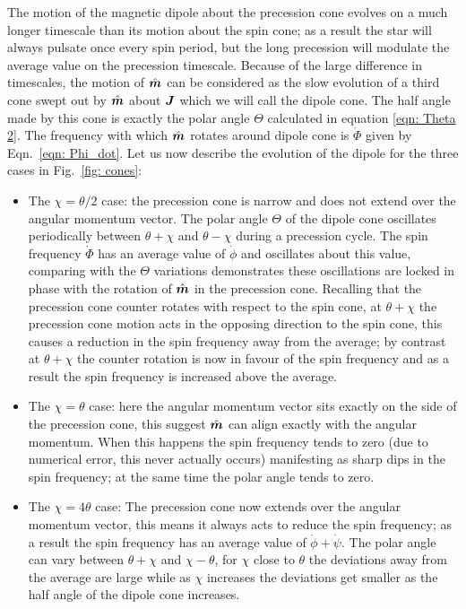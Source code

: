\documentclass[../full_thesis/full_thesis.tex]{subfiles}
\begin{document}
The motion of the magnetic dipole about the precession cone evolves on a much
longer timescale than its motion about the spin cone; as a result the star will
always pulsate once every spin period, but the long precession will modulate
the average value on the precession timescale. Because of the large difference
in timescales, the motion of $\hat{\boldsymbol{m}}$ can be considered as the slow evolution of a
third cone swept out by $\hat{\boldsymbol{m}}$ about $\boldsymbol{J}$ which we will call the dipole cone. The
half angle made by this cone is exactly the polar angle $\Theta$ calculated in
equation \eqref{eqn: Theta 2}. The frequency with which $\hat{\boldsymbol{m}}$ rotates around
dipole cone is $\dot{\Phi}$ given by Eqn.~\eqref{eqn: Phi_dot}. Let us now
describe the evolution of the dipole for the three cases in Fig.~\ref{fig: cones}:
\begin{itemize}
\item The $\chi = \theta/2$ case: the precession cone is narrow and does not
extend over the angular momentum vector. The polar angle $\Theta$ of the dipole
cone oscillates periodically between $\theta+\chi$ and $\theta-\chi$
during a precession cycle. The spin frequency $\dot{\Phi}$ has an average value
of $\dot{\phi}$ and
oscillates about this value, comparing with the $\Theta$ variations
demonstrates these oscillations are locked in phase with the rotation of $\hat{\boldsymbol{m}}$
in the precession cone. Recalling that the precession cone counter rotates with
respect to the spin cone, at $\theta+\chi$ the precession cone motion acts in
the opposing direction to the spin cone, this causes a reduction in the spin
frequency away from the average; by contrast at $\theta+\chi$ the counter
rotation is now in favour of the spin frequency and as a result the spin
frequency is increased above the average.

\item The $\chi = \theta$ case: here the angular momentum vector sits exactly
on the side of the precession cone, this suggest $\hat{\boldsymbol{m}}$ can align exactly with
the angular momentum. When this happens the spin frequency tends to zero (due
to numerical error, this never actually occurs) manifesting as sharp dips in the
spin frequency; at the same time the polar angle tends to zero.

\item The $\chi = 4\theta$ case: The precession cone now extends over the
angular momentum vector, this means it always acts to reduce the spin
frequency; as a result the spin frequency has an average value of
$\dot{\phi} + \dot{\psi}$. The polar angle can vary between $\theta+\chi$ and
$\chi-\theta$, for $\chi$ close to $\theta$ the deviations away from the
average are large while as $\chi$ increases the deviations get smaller as
the half angle of the dipole cone increases.
\end{itemize}
\end{document}
